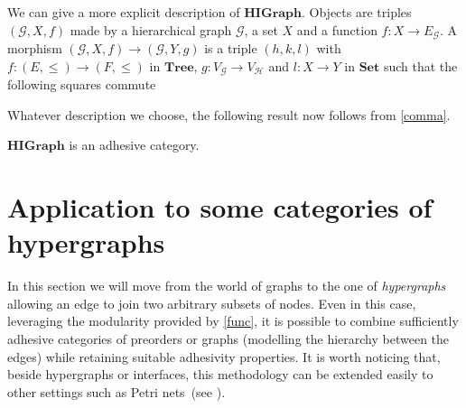 \documentclass[runningheads,envcountsect]{lmcs}
\newcommand{\catname}[1]{\mathbf{#1}}
\newcommand{\tree}{\catname{Tree}}
\theoremstyle{plain}
\theoremstyle{definition}
\begin{document}
We can give a more explicit description of $\catname{HIGraph}$. Objects are triples $(\mathcal{G}, X, f)$ made by a hierarchical graph $\mathcal{G}$, a set $X$ and a function $f:X\rightarrow E_\mathcal{G}$. A morphism $(\mathcal{G}, X, f)\rightarrow (\mathcal{G}, Y, g)$ is a triple $(h,k,l)$ with $f:(E, \leq)\rightarrow (F, \leq)$ in $\tree$, $g:V_\mathcal{G}\rightarrow V_\mathcal{H}$  and $l:X\rightarrow Y$ in $\catname{Set}$ such that the following squares commute
\begin{center}
\end{center}

Whatever description we choose, the following result now follows from \cref{comma}.
\begin{thm}\label{interface}
	$\catname{HIGraph}$ is an adhesive category.
\end{thm}
\section{Application to some categories of hypergraphs}\label{sec:hyper}
In this section we will move from the world of graphs to the one of \emph{hypergraphs} allowing an edge to join two arbitrary subsets of nodes. Even in this case,  leveraging the modularity provided by \cref{func}, it is possible to combine sufficiently adhesive categories of preorders or graphs (modelling the hierarchy between the edges) while retaining suitable adhesivity properties.  It is worth noticing that, beside hypergraphs or interfaces, this methodology can be extended easily to other settings such as Petri nets~(see \cite{ehrig1991parallelism}).
\end{document}
